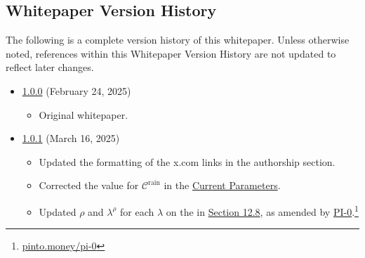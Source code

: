 \documentclass[class=article, crop=false]{standalone}
\begin{document}

\subsection{Whitepaper Version History}

The following is a complete version history of this whitepaper. Unless otherwise noted, references within this Whitepaper Version History are not updated to reflect later changes.

\begin{itemize}[topsep=0pt, itemsep=3pt,leftmargin=16pt]
    \item \href{https://github.com/pinto-org/whitepaper/blob/master/version-history/pinto1_0_0.pdf}{1.0.0} (February 24, 2025)
    
    \begin{itemize}
        \item Original whitepaper.
    \end{itemize}
    
    \item \href{https://github.com/pinto-org/whitepaper/blob/master/version-history/pinto1_0_1.pdf}{1.0.1} (March 16, 2025)
    
    \begin{itemize}
        \item Updated the formatting of the x.com links in the authorship section.
        \item Corrected the value for $\mathscr{C}^{\text{rain}}$ in the \hyperlink{subsection.12.1}{Current Parameters}.
        \item Updated $\rho$ and $\lambda^{\rho}$ for each $\lambda$ on the  in \hyperlink{subsection.12.8}{Section 12.8}, as amended by \href{https://pinto.money/pi-0}{PI-0}.\footnote{\href{https://pinto.money/pi-0}{pinto.money/pi-0}}
    \end{itemize}
    
\end{itemize}
\end{document}
